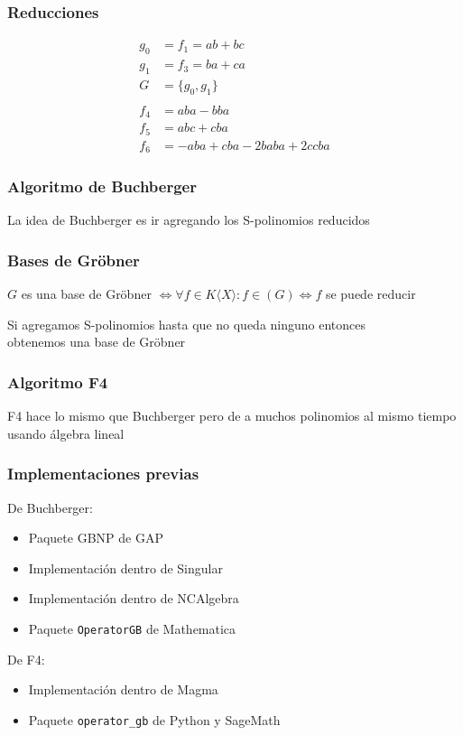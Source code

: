 \documentclass[spanish, aspectratio=169, hidecontrols]{beamer}
\begin{document}
\begin{frame}
  \frametitle{Reducciones}
  \begin{align*}
    g_0 &= f_1 = ab + bc \\
    g_1 &= f_3 = ba + ca \\
    G &= \{g_0, g_1\} \\
    & \\
    f_4 &= aba - bba \\
    f_5 &= abc + cba \\
    f_6 &= -aba + cba - 2 baba + 2 ccba
  \end{align*}
\end{frame}

\begin{frame}
  \frametitle{Algoritmo de Buchberger}
  \pause

  La idea de Buchberger es ir agregando los S-polinomios reducidos
\end{frame}

\begin{frame}
  \frametitle{Bases de Gröbner}
  $G$ es una base de Gröbner $⇔ ∀f ∈ K⟨X⟩ : f ∈ (G) ⇔ f$ se puede reducir \\

  \pause

  Si agregamos S-polinomios hasta que no queda ninguno entonces \\ obtenemos una base de Gröbner
\end{frame}

\begin{frame}
  \frametitle{Algoritmo F4}
  \pause

  F4 hace lo mismo que Buchberger pero de a muchos polinomios al mismo tiempo usando álgebra lineal
\end{frame}

\begin{frame}
  \frametitle{Implementaciones previas}
  \pause
  De Buchberger:
  \begin{itemize}
    \item Paquete GBNP de GAP
    \item Implementación dentro de Singular
    \item Implementación dentro de NCAlgebra
    \item Paquete \texttt{OperatorGB} de Mathematica
  \end{itemize}
  \pause
  De F4:
  \begin{itemize}
    \item Implementación dentro de Magma
    \item Paquete \texttt{operator\_gb} de Python y SageMath
  \end{itemize}
\end{frame}
\end{document}
